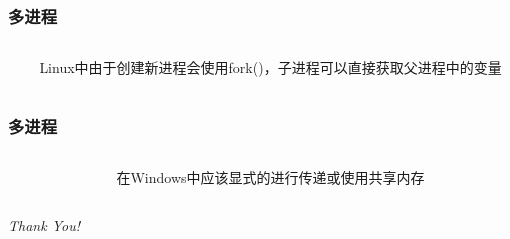 \documentclass[hyperref={pdfpagelabels=false}]{beamer}
\begin{document}
\begin{frame}
	\frametitle{多进程}
	\begin{columns}
		\begin{column}{.5\linewidth}
			
		\end{column}
	
		\begin{column}{.5\linewidth}
		Linux中由于创建新进程会使用fork()，子进程可以直接获取父进程中的变量
		\end{column}
	\end{columns}
\end{frame}

\begin{frame}
	\frametitle{多进程}
	\begin{columns}
		\begin{column}{.5\linewidth}
			
		\end{column}
	
		\begin{column}{.5\linewidth}
			在Windows中应该显式的进行传递或使用共享内存
		\end{column}
	\end{columns}
\end{frame}

\begin{frame}{}
	\centering \Huge
	\emph{Thank You!}
\end{frame} 
\end{document}
